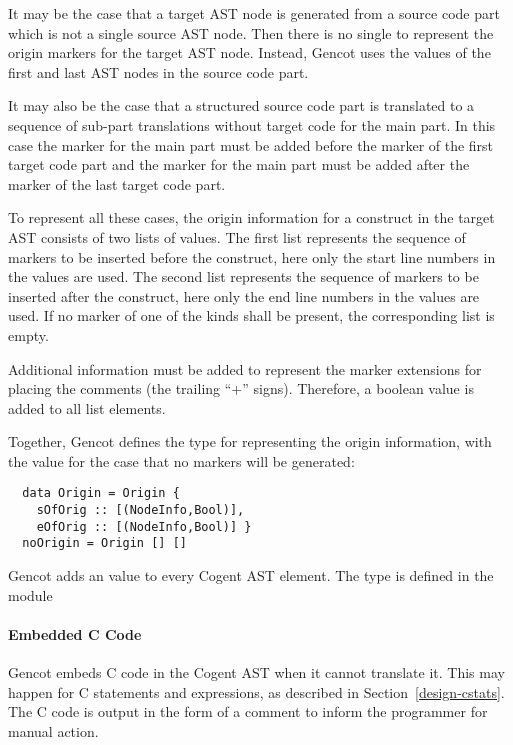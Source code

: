 It may be the case that a target AST node is generated from a source code part which is not a single source AST node. Then
there is no single  to represent the origin markers for the target AST node. Instead, Gencot uses the 
 values of the first and last AST nodes in the source code part.

It may also be the case that a structured source code part is translated to a sequence of sub-part translations without target
code for the main part. In this case the  marker for the main part must be added before the  
marker of the first target code part and the  marker for the main part must be added after the  
marker of the last target code part. 

To represent all these cases, the origin information for a construct in the target AST consists of two lists of 
values. The first list represents the sequence of  markers to be inserted before the construct, here only the
start line numbers in the  values are used. The second list represents the sequence of  markers 
to be inserted after the construct, here only the end line numbers in the  values are used. If no marker of
one of the kinds shall be present, the corresponding list is empty.

Additional information must be added to represent the marker extensions for placing the comments (the trailing ``+'' signs).
Therefore, a boolean value is added to all list elements.

Together, Gencot defines the type  for representing the origin information, with the value 
for the case that no markers will be generated:
\begin{verbatim}
  data Origin = Origin { 
    sOfOrig :: [(NodeInfo,Bool)], 
    eOfOrig :: [(NodeInfo,Bool)] } 
  noOrigin = Origin [] []
\end{verbatim}
Gencot adds an  value to every Cogent AST element. The type  is defined in the module 

\paragraph{Embedded C Code}

Gencot embeds C code in the Cogent AST when it cannot translate it. This may happen for C statements and expressions, as
described in Section~\ref{design-cstats}. The C code is output in the form of a comment to inform the programmer for 
manual action.

